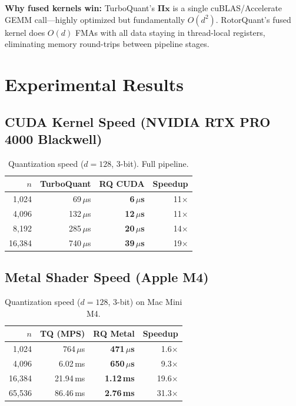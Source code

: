 \documentclass[10pt,twocolumn]{article}
\begin{document}
\textbf{Why fused kernels win:} TurboQuant's $\mathbf{\Pi x}$ is a single cuBLAS/Accelerate GEMM call---highly optimized but fundamentally $O(d^2)$.
RotorQuant's fused kernel does $O(d)$ FMAs with all data staying in thread-local registers, eliminating memory round-trips between pipeline stages.

\section{Experimental Results}
\label{sec:results}

\subsection{CUDA Kernel Speed (NVIDIA RTX PRO 4000 Blackwell)}

\begin{table}[h]
\centering
\caption{Quantization speed ($d=128$, 3-bit). Full pipeline.}
\label{tab:cuda_speed}
\begin{tabular}{@{}rrrr@{}}
\toprule
$n$ & TurboQuant & RQ CUDA & Speedup \\
\midrule
1,024 & 69\,$\mu$s & \textbf{6\,$\mu$s} & 11$\times$ \\
4,096 & 132\,$\mu$s & \textbf{12\,$\mu$s} & 11$\times$ \\
8,192 & 285\,$\mu$s & \textbf{20\,$\mu$s} & 14$\times$ \\
16,384 & 740\,$\mu$s & \textbf{39\,$\mu$s} & 19$\times$ \\
\bottomrule
\end{tabular}
\end{table}

\subsection{Metal Shader Speed (Apple M4)}

\begin{table}[h]
\centering
\caption{Quantization speed ($d=128$, 3-bit) on Mac Mini M4.}
\label{tab:metal_speed}
\begin{tabular}{@{}rrrr@{}}
\toprule
$n$ & TQ (MPS) & RQ Metal & Speedup \\
\midrule
1,024 & 764\,$\mu$s & \textbf{471\,$\mu$s} & 1.6$\times$ \\
4,096 & 6.02\,ms & \textbf{650\,$\mu$s} & 9.3$\times$ \\
16,384 & 21.94\,ms & \textbf{1.12\,ms} & 19.6$\times$ \\
65,536 & 86.46\,ms & \textbf{2.76\,ms} & 31.3$\times$ \\
\bottomrule
\end{tabular}
\end{table}
\end{document}
